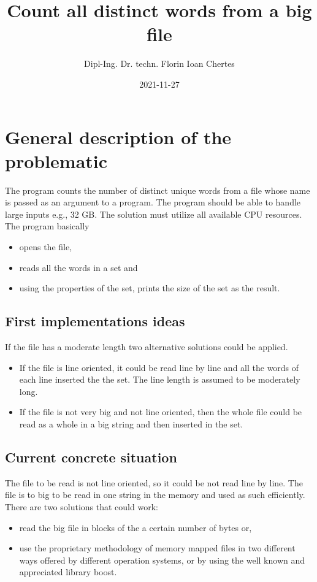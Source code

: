 \documentclass{article}
\title{Count all distinct words from a big file}
\date{2021-11-27}
\author{Dipl-Ing. Dr. techn. Florin Ioan Chertes}
\begin{document}
\maketitle
{}
\newpage
{}

\section{General description of the problematic}

The program counts the number of distinct unique words from a file whose name is passed as an argument to a program. The program should be able to handle large inputs e.g., 32 GB. The solution must utilize all available CPU resources.
The program basically

\begin{itemize}
	\item opens the file,
	\item reads all the words in a set and
	\item using the properties of the set, prints the size of the set as the result.
\end{itemize}

\subsection{First implementations ideas}
If the file has a moderate length two alternative solutions could be applied. 
\begin{itemize}
	\item If the file is line oriented, it could be read line by line and all the words of each line inserted the the set. The line length is assumed to be moderately long. 
	\item If the file is not very big and not line oriented, then the whole file could be read as a whole in a big string and then inserted in the set.
\end{itemize}

\subsection{Current concrete situation}

The file to be read is not line oriented, so it could be not read line by line. The file is to big to be read in one string in the memory and used as such efficiently. There are two solutions that could work:

\begin{itemize}
	\item read the big file in blocks of the a certain number of bytes or,
	\item use the proprietary methodology of memory mapped files in two different ways
	\subitem offered by different operation systems, or 
	\subitem by using the well known and appreciated library boost.
\end{itemize}
\end{document}
